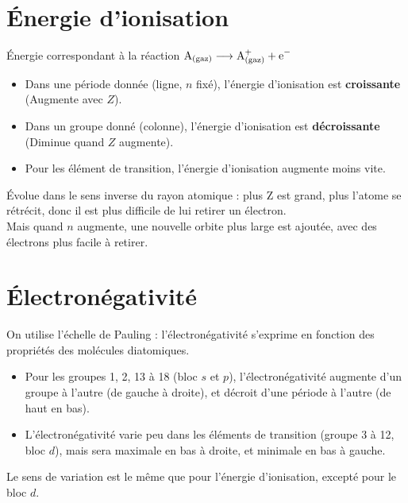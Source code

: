 \documentclass[13pt, twoside, a4paper, french, tikz]{report}
\begin{document}
  
  \section{Énergie d'ionisation}\label{sec:energie-d'ionisation}
    
    Énergie correspondant à la réaction $\ce{A_{(gaz)}} \longrightarrow \ce{A^+_{(gaz)}} + \ce{e^-}$
    
    \begin{itemize}
      \item Dans une période donnée (ligne, $n$ fixé), l'énergie d'ionisation est \textbf{croissante} (Augmente avec $Z$).
      \item Dans un groupe donné (colonne), l'énergie d'ionisation est \textbf{décroissante} (Diminue quand $Z$ augmente).
      \item Pour les élément de transition, l'énergie d'ionisation augmente moins vite.
    \end{itemize}
    \vspace{7pt}
    
    Évolue dans le sens inverse du rayon atomique : plus Z est grand, plus l'atome se rétrécit, donc il est plus difficile de lui retirer un électron.\\
    Mais quand $n$ augmente, une nouvelle orbite plus large est ajoutée, avec des électrons plus facile à retirer.
  
  
  \section{Électronégativité}\label{sec:electronegativite}
    
    On utilise l'échelle de Pauling : l'électronégativité s'exprime en fonction des propriétés des molécules diatomiques.
    
    \begin{itemize}
      \item Pour les groupes 1, 2, 13 à 18 (bloc $s$ et $p$), l'électronégativité augmente d'un groupe à l'autre (de gauche à droite), et décroit d'une période à l'autre (de haut en bas).
      \item L'électronégativité varie peu dans les éléments de transition (groupe 3 à 12, bloc $d$), mais sera maximale en bas à droite, et minimale en bas à gauche.
    \end{itemize}
    \vspace{7pt}
    
    Le sens de variation est le même que pour l'énergie d'ionisation, excepté pour le bloc $d$.\\
    
\end{document}
